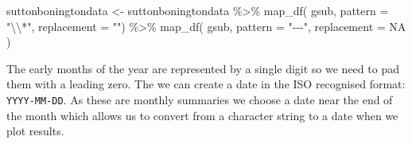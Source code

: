\documentclass{article}
\newenvironment{Shaded}{\begin{snugshade}}{\end{snugshade}}
\newcommand{\AttributeTok}[1]{\textcolor[rgb]{0.77,0.63,0.00}{#1}}
\newcommand{\CommentTok}[1]{\textcolor[rgb]{0.56,0.35,0.01}{\textit{#1}}}
\newcommand{\ConstantTok}[1]{\textcolor[rgb]{0.00,0.00,0.00}{#1}}
\newcommand{\DecValTok}[1]{\textcolor[rgb]{0.00,0.00,0.81}{#1}}
\newcommand{\FunctionTok}[1]{\textcolor[rgb]{0.00,0.00,0.00}{#1}}
\newcommand{\NormalTok}[1]{#1}
\newcommand{\OtherTok}[1]{\textcolor[rgb]{0.56,0.35,0.01}{#1}}
\newcommand{\SpecialCharTok}[1]{\textcolor[rgb]{0.00,0.00,0.00}{#1}}
\newcommand{\StringTok}[1]{\textcolor[rgb]{0.31,0.60,0.02}{#1}}
\begin{document}
\begin{Shaded}
\begin{Highlighting}[]
\NormalTok{suttonboningtondata }\OtherTok{\textless{}{-}}\NormalTok{ suttonboningtondata }\SpecialCharTok{\%\textgreater{}\%}
                        \FunctionTok{map\_df}\NormalTok{( gsub,}
                                \AttributeTok{pattern =} \StringTok{"}\SpecialCharTok{\textbackslash{}\textbackslash{}}\StringTok{*"}\NormalTok{,}
                                \AttributeTok{replacement =} \StringTok{""}\NormalTok{) }\SpecialCharTok{\%\textgreater{}\%}
                        \FunctionTok{map\_df}\NormalTok{( gsub,}
                                \AttributeTok{pattern =} \StringTok{"{-}{-}{-}"}\NormalTok{,}
                                \AttributeTok{replacement =} \ConstantTok{NA}
\NormalTok{                                )}
\end{Highlighting}
\end{Shaded}

The early months of the year are represented by a single digit so we need to pad them with a leading zero. The we can create a date in the ISO recognised format: \texttt{YYYY-MM-DD}. As these are monthly summaries we choose a date near the end of the month which allows us to convert from a character string to a date when we plot results.

\begin{Shaded}
\end{Shaded}
\end{document}
